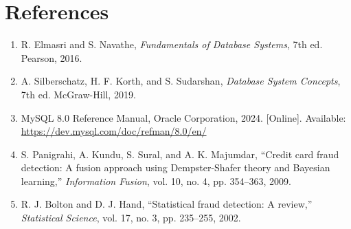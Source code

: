 \documentclass[a4paper,12pt]{article}
\begin{document}
\section{References}

\begin{enumerate}
    \item R. Elmasri and S. Navathe, \textit{Fundamentals of Database Systems}, 7th ed. Pearson, 2016.
    \item A. Silberschatz, H. F. Korth, and S. Sudarshan, \textit{Database System Concepts}, 7th ed. McGraw-Hill, 2019.
    \item MySQL 8.0 Reference Manual, Oracle Corporation, 2024. [Online]. Available: \url{https://dev.mysql.com/doc/refman/8.0/en/}
    \item S. Panigrahi, A. Kundu, S. Sural, and A. K. Majumdar, ``Credit card fraud detection: A fusion approach using Dempster-Shafer theory and Bayesian learning,'' \textit{Information Fusion}, vol. 10, no. 4, pp. 354--363, 2009.
    \item R. J. Bolton and D. J. Hand, ``Statistical fraud detection: A review,'' \textit{Statistical Science}, vol. 17, no. 3, pp. 235--255, 2002.
\end{enumerate}
\end{document}
